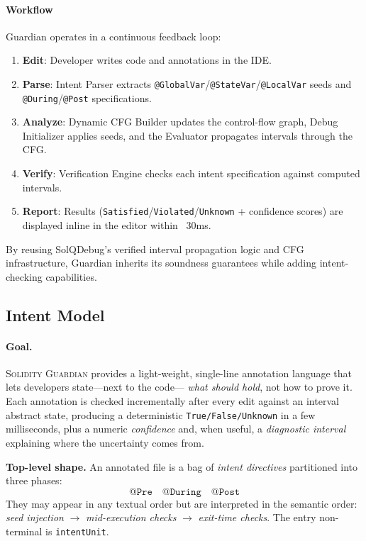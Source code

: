\documentclass[pdflatex,sn-basic]{sn-jnl}%
\theoremstyle{thmstyleone}%
\theoremstyle{thmstyletwo}%
\theoremstyle{thmstylethree}%
\begin{document}
\paragraph{Workflow}
Guardian operates in a continuous feedback loop:
\begin{enumerate}
    \item \textbf{Edit}: Developer writes code and annotations in the IDE.
    \item \textbf{Parse}: Intent Parser extracts \texttt{@GlobalVar}/\texttt{@StateVar}/\texttt{@LocalVar} seeds and \texttt{@During}/\texttt{@Post} specifications.
    \item \textbf{Analyze}: Dynamic CFG Builder updates the control-flow graph, Debug Initializer applies seeds, and the Evaluator propagates intervals through the CFG.
    \item \textbf{Verify}: Verification Engine checks each intent specification against computed intervals.
    \item \textbf{Report}: Results (\texttt{Satisfied}/\texttt{Violated}/\texttt{Unknown} + confidence scores) are displayed inline in the editor within ~30ms.
\end{enumerate}

By reusing SolQDebug's verified interval propagation logic and CFG infrastructure, Guardian inherits its soundness guarantees while adding intent-checking capabilities.


\subsection{Intent Model}
\label{sec:intent-model}

\paragraph{Goal.}
\textsc{Solidity Guardian} provides a light-weight, single-line
annotation language that lets developers state—next to the code—
\emph{what should hold}, not how to prove it.
Each annotation is checked incrementally after every edit against
an interval abstract state, producing a deterministic
\texttt{True/False/Unknown} in a few milliseconds, plus a numeric
\emph{confidence} and, when useful, a \emph{diagnostic interval}
explaining where the uncertainty comes from.

\vspace{0.25em}
\noindent\textbf{Top-level shape.}
An annotated file is a bag of \emph{intent directives} partitioned
into three phases:
\[
\texttt{@Pre}\quad\texttt{@During}\quad\texttt{@Post}
\]
They may appear in any textual order but are interpreted in the
semantic order:
\emph{seed injection} $\rightarrow$ \emph{mid-execution checks}
$\rightarrow$ \emph{exit-time checks}.
The entry non-terminal is \texttt{intentUnit}.
\end{document}
